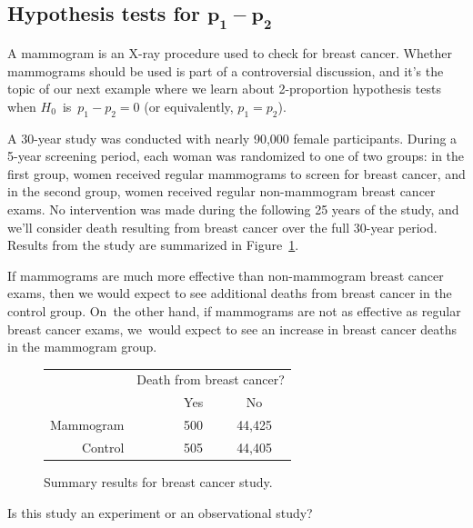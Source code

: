 \subsection[Hypothesis tests for $p_1 - p_2$]
    {Hypothesis tests for $\mathbf{p_1 - p_2}$}


A mammogram is an X-ray procedure used to check for
breast cancer.
Whether mammograms should be used is part of a
controversial discussion, and it's the topic of our
next example where we learn about 2-proportion
hypothesis tests when $H_0$~is~$p_1 - p_2 = 0$
(or equivalently, $p_1 = p_2$).

A 30-year study was conducted with nearly 90,000 female participants. During a 5-year screening period, each woman was randomized to one of two groups: in the first group, women received regular mammograms to screen for breast cancer, and in the second group, women received regular non-mammogram breast cancer exams. No intervention was made during the following 25 years of the study, and we'll consider death resulting from breast cancer over the full 30-year period. Results from the study are summarized in Figure~\ref{mammogramStudySummaryTable}.

If mammograms are much more effective than non-mammogram breast cancer exams, then we would expect to see additional deaths from breast cancer in the control group. On~the other hand, if mammograms are not as effective as regular breast cancer exams, we~would expect to see an increase in breast cancer deaths in the mammogram group.

\begin{figure}[h]
\centering
\begin{tabular}{rrcc}
	& \multicolumn{3}{c}{Death from breast cancer?} \\
  \cline{2-4}
 & \ \hspace{3mm}\ & Yes & No \\
  \hline
Mammogram && 500 & 44,425 \\
Control && 505 & 44,405 \\
   \hline
\end{tabular}
\caption{Summary results for breast cancer study.}
\label{mammogramStudySummaryTable}
\end{figure}

\begin{exercisewrap}
\begin{nexercise}
Is this study an experiment or an observational study?\footnotemark{}
\end{nexercise}
\end{exercisewrap}

